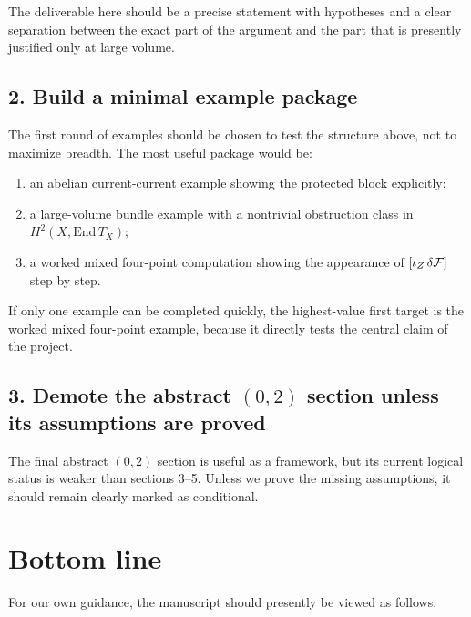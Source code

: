\documentclass[11pt]{article}
\begin{document}
The deliverable here should be a precise statement with hypotheses and a clear separation between the exact part of the argument and the part that is presently justified only at large volume.

\subsection*{2. Build a minimal example package}

The first round of examples should be chosen to test the structure above, not to maximize breadth. The most useful package would be:
\begin{enumerate}
\item an abelian current-current example showing the protected block explicitly;
\item a large-volume bundle example with a nontrivial obstruction class in $H^2(X,\mathrm{End}\,T_X)$;
\item a worked mixed four-point computation showing the appearance of $[\iota_Z\,\delta{\cal F}]$ step by step.
\end{enumerate}

If only one example can be completed quickly, the highest-value first target is the worked mixed four-point example, because it directly tests the central claim of the project.

\subsection*{3. Demote the abstract $(0,2)$ section unless its assumptions are proved}

The final abstract $(0,2)$ section is useful as a framework, but its current logical status is weaker than sections 3--5. Unless we prove the missing assumptions, it should remain clearly marked as conditional.

\section{Bottom line}

For our own guidance, the manuscript should presently be viewed as follows.
\end{document}
